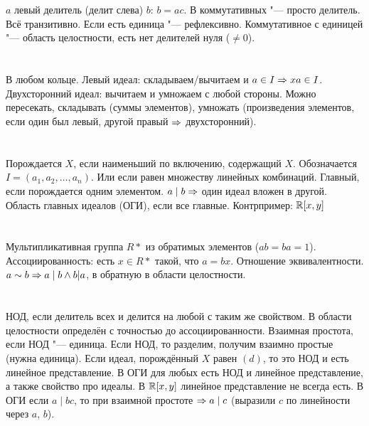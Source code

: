 \section{} %
$a$ левый делитель (делит слева) $b$: $b=ac$.
В коммутативных "--- просто делитель.
Всё транзитивно.
Если есть единица "--- рефлексивно.
Коммутативное с единицей "--- область целостности, есть нет делителей нуля ($\ne 0$).

\section{} %
В любом кольце.
Левый идеал: складываем/вычитаем и $a \in I \Rightarrow xa \in I$.
Двухсторонний идеал: вычитаем и умножаем с любой стороны.
Можно пересекать, складывать (суммы элементов), умножать (произведения элементов, если один был левый, другой правый $\Rightarrow$ двухсторонний).

\section{} %
Порождается $X$, если наименьший по включению, содержащий $X$.
Обозначается $I=(a_1, a_2, \dots, a_n)$.
Или если равен множеству линейных комбинаций.
Главный, если порождается одним элементом.
$a \mid b \Rightarrow$ один идеал вложен в другой.
Область главных идеалов (ОГИ), если все главные.
Контрпример: $\mathbb{R}[x, y]$

\section{} %
Мультипликативная группа $R*$ из обратимых элементов ($ab=ba=1$).
Ассоциированность: есть $x \in R*$ такой, что $a=bx$.
Отношение эквивалентности.
$a \sim b \Rightarrow a \mid b \land b | a$, в обратную в области целостности.

\section{} %
НОД, если делитель всех и делится на любой с таким же свойством.
В области целостности определён с точностью до ассоциированности.
Взаимная простота, если НОД "--- единица.
Если НОД, то разделим, получим взаимно простые (нужна единица).
Если идеал, порождённый $X$ равен $(d)$, то это НОД и есть линейное представление.
В ОГИ для любых есть НОД и линейное представление, а также свойство про идеалы.
В $\mathbb{R}[x, y]$ линейное представление не всегда есть.
В ОГИ если $a \mid bc$, то при взаимной простоте $\Rightarrow a \mid c$ (выразили $c$ по линейности через $a$, $b$).

